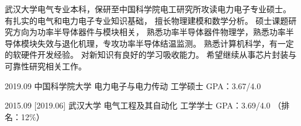 \documentclass[zh]{resume}
\begin{document}
\makeheader

{\onehalfspacing\hspace{2em}%
武汉大学电气专业本科，保研至中国科学院电工研究所攻读电力电子专业硕士。
有扎实的电气和电力电子专业知识基础，
擅长物理建模和数学分析。
硕士课题研究方向为功率半导体器件与模块相关，
熟悉功率半导体器件物理学，熟悉功率半导体模块失效与退化机理，专攻功率半导体结温监测。
熟悉计算机科学，有一定的软硬件开发经验。
对新知识有良好的学习吸收能力。
希望继续从事芯片封装与可靠性研究相关工作。
\par}

\begin{educations}
  \education%
    {2019.09}%
    {中国科学院大学}%
    {电力电子与电力传动}%
    {工学硕士}%
    {GPA：3.67/4.0}
    

  \separator{0.1ex}
  \education%
    {2015.09}%
    [2019.06]%
    {武汉大学}%
    {电气工程及其自动化}%
    {工学学士}%
    {GPA：3.69/4.0 （排名：12\%）}
\end{educations}

\begin{competences}

    
\end{competences}
\end{document}
